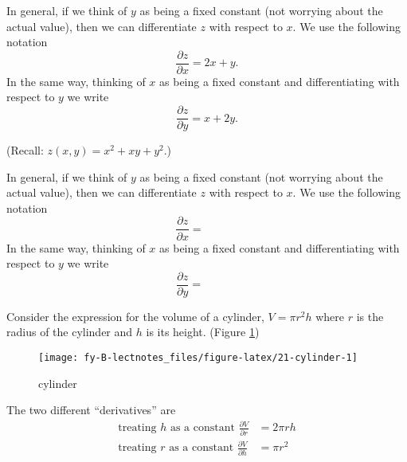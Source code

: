 \documentclass[
  11pt,
  oneside]{book}
\newcommand{\slide}{}
\theoremstyle{definition}
\theoremstyle{definition}
\theoremstyle{definition}
\theoremstyle{definition}
\theoremstyle{remark}
\begin{document}
\begin{notslides}

In general, if we think of \(y\) as being a fixed constant (not worrying about the actual value), then we can differentiate \(z\) with respect to \(x\). We use the following notation
\[
\frac{\partial z}{\partial x} = 2x+y.
\]
In the same way, thinking of \(x\) as being a fixed constant and differentiating with respect to \(y\) we write
\[
\frac{\partial z}{\partial y} = x + 2y.
\]

\end{notslides}

\begin{slidesonly}

(Recall: \(z(x,y) = x^2+xy+y^2\).)

In general, if we think of \(y\) as being a fixed constant (not worrying about the actual value), then we can differentiate \(z\) with respect to \(x\). We use the following notation
\[
\frac{\partial z}{\partial x} = \phantom{2x+y.}
\]
In the same way, thinking of \(x\) as being a fixed constant and differentiating with respect to \(y\) we write
\[
\frac{\partial z}{\partial y} = \phantom{x + 2y.}
\]

\slide

\end{slidesonly}

Consider the expression for the volume of a cylinder, \(V = \pi r^2h\) where \(r\) is the radius of the cylinder and \(h\) is its height. (Figure \ref{fig:21-cylinder})

\begin{figure}

{\centering \texttt{[image: fy-B-lectnotes\_files/figure-latex/21-cylinder-1]} 

}

\caption{cylinder}\label{fig:21-cylinder}
\end{figure}

\begin{notslides}

The two different ``derivatives'' are
\begin{align*}
\text{treating }h\text{ as a constant } \frac{\partial V}{\partial r} &= 2\pi rh\\
\text{treating }r\text{ as a constant } \frac{\partial V}{\partial h} &= \pi r^2
\end{align*}

\end{notslides}
\end{document}
